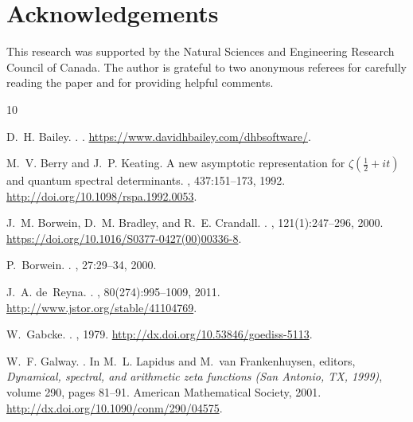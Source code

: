 \documentclass[12pt]{article}
\theoremstyle{definition}
\begin{document}
\section*{Acknowledgements}

This research was supported by the Natural Sciences and Engineering Research Council of Canada.  The author is
 grateful to two anonymous referees for carefully reading the paper and for providing helpful comments.



%
%

\begin{thebibliography}{10}

D.~H. Bailey.
.
.
\newblock \url{https://www.davidhbailey.com/dhbsoftware/}.

M.~V. Berry and J.~P. Keating.
\newblock A new asymptotic representation for $\zeta(\frac{1}{2} + it)$ and
  quantum spectral determinants.
, 437:151--173, 1992.
\newblock \url{http://doi.org/10.1098/rspa.1992.0053}.

J.~M. Borwein, D.~M. Bradley, and R.~E. Crandall.
.
,
  121(1):247--296, 2000.
\newblock \url{https://doi.org/10.1016/S0377-0427(00)00336-8}.

P.~Borwein.
.
, 27:29--34, 2000.

J.~A. de~Reyna.
.
, 80(274):995--1009, 2011.
\newblock \url{http://www.jstor.org/stable/41104769}.

W.~Gabcke.
.
, 1979.
\newblock \url{http://dx.doi.org/10.53846/goediss-5113}.

W.~F. Galway.
.
\newblock In M.~L. Lapidus and M.~van Frankenhuysen, editors, {\em Dynamical,
  spectral, and arithmetic zeta functions (San Antonio, TX, 1999)}, volume 290,
  pages 81--91. American Mathematical Society, 2001.
\newblock \url{http://dx.doi.org/10.1090/conm/290/04575}.


\end{thebibliography}
\end{document}
